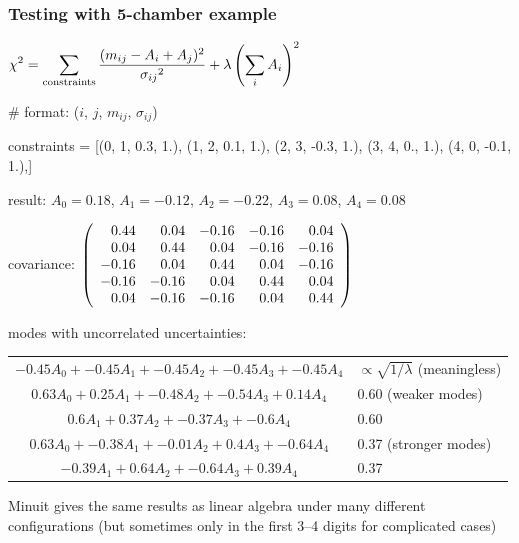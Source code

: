 \documentclass[compress]{beamer}
\begin{document}
\begin{frame}
\frametitle{Testing with 5-chamber example}

\scriptsize
\begin{minipage}{1.05\linewidth}

$\displaystyle \chi^2 = \sum_{\mbox{\scriptsize constraints}} \frac{(m_{ij} - A_i + A_j)^2}{{\sigma_{ij}}^2} + \lambda \left(\sum_i A_i\right)^2$

\vspace{0.3 cm}
\# format: ($i$, $j$, $m_{ij}$, $\sigma_{ij}$)

constraints = [(0, 1, 0.3, 1.), (1, 2, 0.1, 1.), (2, 3, -0.3, 1.), (3, 4, 0., 1.), (4, 0, -0.1, 1.),]

\vspace{0.3 cm}
result: $A_0 = 0.18$, $A_1 = -0.12$, $A_2 = -0.22$, $A_3 = 0.08$, $A_4 = 0.08$

\vspace{0.3 cm}
covariance: $\left(\begin{array}{r r r r r}
0.44 & 0.04 & -0.16 & -0.16 & 0.04 \\
0.04 & 0.44 & 0.04 & -0.16 & -0.16 \\
-0.16 & 0.04 & 0.44 & 0.04 & -0.16 \\
-0.16 & -0.16 & 0.04 & 0.44 & 0.04 \\
0.04 & -0.16 & -0.16 & 0.04 & 0.44 \\
\end{array}\right)$

\vspace{0.3 cm}
modes with uncorrelated uncertainties:

\vspace{0.1 cm}
\renewcommand{\arraystretch}{1.3}
\begin{tabular}{c | l}
$-0.45 A_{0} + -0.45 A_{1} + -0.45 A_{2} + -0.45 A_{3} + -0.45 A_{4}$ & $\propto \sqrt{1/\lambda}$ (meaningless) \\
$0.63 A_{0} + 0.25 A_{1} + -0.48 A_{2} + -0.54 A_{3} + 0.14 A_{4}$ & 0.60 (weaker modes) \\
$0.6 A_{1} + 0.37 A_{2} + -0.37 A_{3} + -0.6 A_{4}$ & 0.60 \\
$0.63 A_{0} + -0.38 A_{1} + -0.01 A_{2} + 0.4 A_{3} + -0.64 A_{4}$ & 0.37 (stronger modes) \\ 
$-0.39 A_{1} + 0.64 A_{2} + -0.64 A_{3} + 0.39 A_{4}$ & 0.37 \\
\end{tabular}

\vspace{0.3 cm}
Minuit gives the same results as linear algebra under many different configurations (but sometimes only in the first 3--4 digits for complicated cases)
\end{minipage}
\end{frame}
\end{document}
